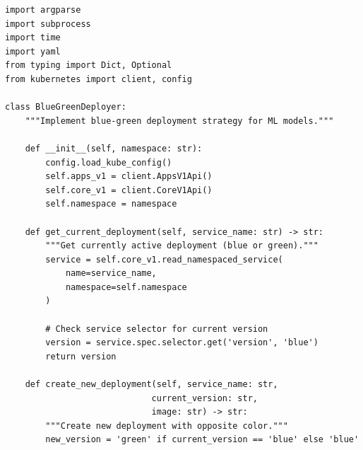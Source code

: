\begin{lstlisting}[style=python, caption=scripts/blue_green_deploy.py]
import argparse
import subprocess
import time
import yaml
from typing import Dict, Optional
from kubernetes import client, config

class BlueGreenDeployer:
    """Implement blue-green deployment strategy for ML models."""

    def __init__(self, namespace: str):
        config.load_kube_config()
        self.apps_v1 = client.AppsV1Api()
        self.core_v1 = client.CoreV1Api()
        self.namespace = namespace

    def get_current_deployment(self, service_name: str) -> str:
        """Get currently active deployment (blue or green)."""
        service = self.core_v1.read_namespaced_service(
            name=service_name,
            namespace=self.namespace
        )

        # Check service selector for current version
        version = service.spec.selector.get('version', 'blue')
        return version

    def create_new_deployment(self, service_name: str,
                             current_version: str,
                             image: str) -> str:
        """Create new deployment with opposite color."""
        new_version = 'green' if current_version == 'blue' else 'blue'


\end{lstlisting}
